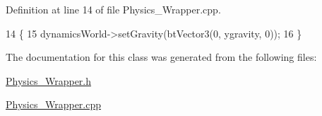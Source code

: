 Definition at line 14 of file Physics\+\_\+\+Wrapper.\+cpp.


\begin{DoxyCode}
14                                                \{
15     dynamicsWorld->setGravity(btVector3(0, ygravity, 0));
16 \}
\end{DoxyCode}


The documentation for this class was generated from the following files\+:\begin{DoxyCompactItemize}
\item 
\hyperlink{_physics___wrapper_8h}{Physics\+\_\+\+Wrapper.\+h}\item 
\hyperlink{_physics___wrapper_8cpp}{Physics\+\_\+\+Wrapper.\+cpp}\end{DoxyCompactItemize}

